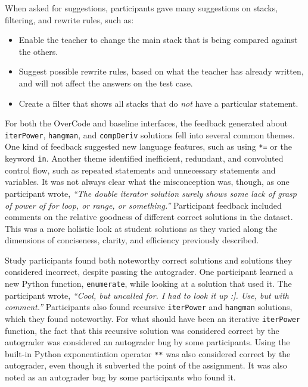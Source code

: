 \documentclass[12pt,twoside]{mitthesis}
\newcommand \codevar[1]{\texttt{#1}}
\providecommand{\DIFdelbegin}{} %
\providecommand{\DIFdelend}{} %
\begin{document}
When asked for suggestions, participants gave many suggestions on stacks, filtering, and rewrite rules, such as:
 \begin{itemize} 
\DIFdelbegin %

\DIFdelend \item Enable the teacher to change the main stack that is being compared against the others.
\item Suggest possible rewrite rules, based on what the teacher has already written, and will not affect the answers on the test case.
\item Create a filter that shows all stacks that do {\it not} have a particular statement.
 \end{itemize} 

For both the OverCode and baseline interfaces, the feedback generated about \codevar{iterPower}, \codevar{hangman}, and \codevar{compDeriv} solutions fell into several common themes. One kind of feedback suggested new language features, such as using \codevar{*=} or the keyword \codevar{in}. Another theme identified inefficient, redundant, and convoluted control flow, such as repeated statements and unnecessary statements and variables. It was not always clear what the misconception was, though, as one participant wrote, \textit{``The double iterator solution surely shows some lack of grasp of power of for loop, or range, or something.''} Participant feedback included comments on the relative goodness of different correct solutions in the dataset. This was a more holistic look at student solutions as they varied along the dimensions of conciseness, clarity, and efficiency previously described.

Study participants found both noteworthy correct solutions and solutions they considered incorrect, despite passing the autograder. One participant learned a new Python function, \codevar{enumerate}, while looking at a solution that used it. The participant wrote, \textit{``Cool, but uncalled for. I had to look it up :]. Use, but with comment.''} Participants also found recursive \codevar{iterPower} and \codevar{hangman} solutions, which they found noteworthy. For what should have been an iterative \codevar{iterPower} function, the fact that this recursive solution was considered correct by the autograder was considered an autograder bug by some participants. Using the built-in Python exponentiation operator \codevar{**} was also considered correct by the autograder, even though it subverted the point of the assignment. It was also noted as an autograder bug by some participants who found it.
\end{document}
